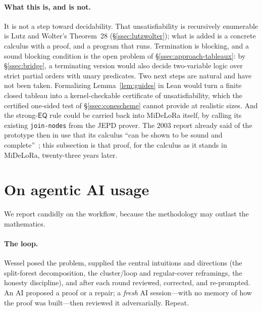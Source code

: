 \documentclass[11pt]{article}
\newcommand{\EQ}{\mathsf{EQ}}
\newcommand{\code}[1]{\texttt{#1}}
\theoremstyle{plain}
\theoremstyle{definition}
\begin{document}
\paragraph{What this is, and is not.} It is not a step toward decidability.
That unsatisfiability is recursively enumerable is Lutz and Wolter's
Theorem~28 (\S\ref{ssec:lutzwolter}); what is added is a concrete calculus
with a proof, and a program that runs. Termination is blocking, and a sound
blocking condition is the open problem of \S\ref{ssec:approach-tableaux}: by
\S\ref{ssec:bridge}, a terminating version would also decide two-variable
logic over strict partial orders with unary predicates. Two next steps are
natural and have not been taken. Formalizing Lemma~\ref{lem:guides} in Lean
would turn a finite closed tableau into a kernel-checkable certificate of
unsatisfiability, which the certified one-sided test of
\S\ref{ssec:conescheme} cannot provide at realistic sizes. And the strong-$\EQ$
rule could be carried back into MiDeLoRa itself, by calling its existing
\code{join-nodes} from the JEPD prover. The 2003 report already said of the
prototype then in use that its calculus ``can be shown to be sound and
complete''~\cite{Wessel2003}; this subsection is that proof, for the calculus
as it stands in MiDeLoRa, twenty-three years later.

\newpage
\section{On agentic AI usage}
\label{sec:agentic}

We report candidly on the workflow, because the methodology may outlast
the mathematics.

\paragraph{The loop.} Wessel posed the problem, supplied the central
intuitions and directions (the split-forest decomposition, the
cluster/loop and regular-cover reframings, the honesty discipline), and
after each round reviewed, corrected, and re-prompted. An AI proposed a
proof or a repair; a \emph{fresh} AI session---with no memory of how the
proof was built---then reviewed it adversarially. Repeat.
\end{document}
